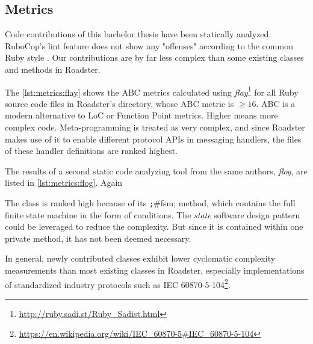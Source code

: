 \subsection{Metrics}
Code contributions of this bachelor thesis have been statically analyzed.
RuboCop's lint feature does not show any "offenses" according to the common Ruby style \cite{rb:style-guide}.
Our contributions are by far less complex than some existing classes and methods in Roadster.

The \autoref{lst:metrics:flay} shows the \gls{ABC} metrics calculated using
\emph{flay}\footnote{\url{http://ruby.sadi.st/Ruby_Sadist.html}} for all Ruby source
code files in Roadster's  directory, whose ABC metric is $\geqslant
16$. ABC is a modern alternative to LoC or Function Point metrics.  Higher
means more complex code. Meta-programming is treated as very complex, and since
Roadster makes use of it to enable different protocol APIs in messaging
handlers, the files of these handler definitions are ranked highest.

The results of a second static code analyzing tool from the same authors,
\emph{flog}, are listed in \autoref{lst:metrics:flog}. Again

The class  is ranked high because of its \texttt;#fsm; method,
which contains the full finite state machine in the form of
conditions. The \emph{state} software design pattern could be leveraged to
reduce the complexity. But since it is contained within one private method, it has not
been deemed necessary.

In general, newly contributed classes exhibit lower cyclomatic complexity
measurements than most existing classes in Roadster, especially implementations
of standardized industry protocols such as IEC
60870-5-104\footnote{\url{https://en.wikipedia.org/wiki/IEC_60870-5\#IEC_60870-5-104}}.


